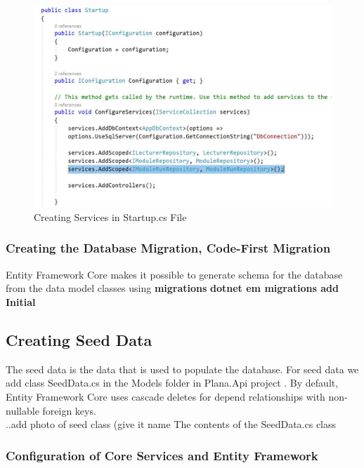 \documentclass{scrartcl}
\begin{document}
\begin{figure}[h]
\centering
\includegraphics[width=150mm]{report_img/add_scoped_rep.JPG}
\caption{Creating Services in Startup.cs File}
\label{blabla}
\end{figure}

 

\cite{core3}

\subsubsection{Creating the Database Migration, Code-First Migration}
Entity Framework Core makes it possible to generate schema for the database from the data model classes using \textbf{migrations}
\textbf{dotnet em migrations add Initial} 
\cite{core3}



\subsection{Creating Seed Data}
The seed data is the data that is used to populate the database. For seed data we add class SeedData.cs in the Models folder in Plana.Api project \cite{core3}.
By default, Entity Framework Core uses cascade deletes for depend relationships with non-nullable foreign keys. \cite{efa} \\
..add photo of seed class (give it name The contents of the SeedData.cs class \\
\subsubsection{Configuration of Core Services and Entity Framework}
\end{document}
